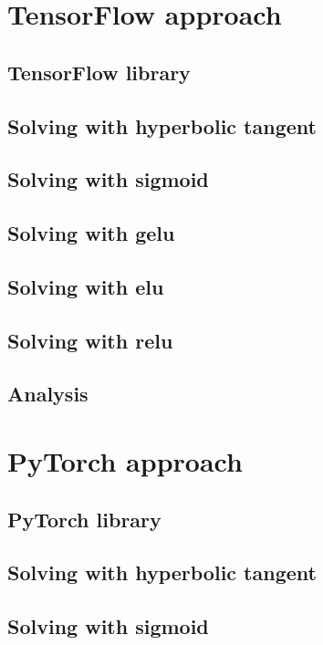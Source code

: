\section{TensorFlow approach}
\subsection{TensorFlow library}
\subsection{Solving with hyperbolic tangent}



\subsection{Solving with sigmoid}

\subsection{Solving with gelu}

\subsection{Solving with elu}

\subsection{Solving with relu}

\subsection{Analysis}


\section{PyTorch approach}
\subsection{PyTorch library}



\subsection{Solving with hyperbolic tangent}



\subsection{Solving with sigmoid}



